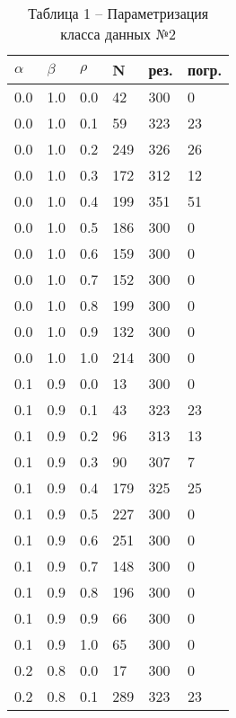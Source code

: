 \label{sec:fig2}

\renewcommand\thetable{} 

\begin{table}[!htb]
	\begin{minipage}{.45\linewidth}
		\caption*{Таблица 1 -- Параметризация класса данных №2}
		\centering
		\begin{tabular}{||p{}p{}p{}p{}p{}p{}||}
			\hline
			$\alpha$ & $\beta$ & $\rho$ & N & рез. & погр. \\ \hline\hline
			0.0 & 1.0 & 0.0 & 42 & 300 & 0 \\ 
			0.0 & 1.0 & 0.1 & 59 & 323 & 23 \\ 
			0.0 & 1.0 & 0.2 & 249 & 326 & 26 \\ 
			0.0 & 1.0 & 0.3 & 172 & 312 & 12 \\ 
			0.0 & 1.0 & 0.4 & 199 & 351 & 51 \\ 
			0.0 & 1.0 & 0.5 & 186 & 300 & 0 \\ 
			0.0 & 1.0 & 0.6 & 159 & 300 & 0 \\ 
			0.0 & 1.0 & 0.7 & 152 & 300 & 0 \\ 
			0.0 & 1.0 & 0.8 & 199 & 300 & 0 \\ 
			0.0 & 1.0 & 0.9 & 132 & 300 & 0 \\ 
			0.0 & 1.0 & 1.0 & 214 & 300 & 0  \\ \hline
			0.1 & 0.9 & 0.0 & 13 & 300 & 0 \\ 
			0.1 & 0.9 & 0.1 & 43 & 323 & 23 \\ 
			0.1 & 0.9 & 0.2 & 96 & 313 & 13 \\ 
			0.1 & 0.9 & 0.3 & 90 & 307 & 7 \\ 
			0.1 & 0.9 & 0.4 & 179 & 325 & 25 \\ 
			0.1 & 0.9 & 0.5 & 227 & 300 & 0 \\ 
			0.1 & 0.9 & 0.6 & 251 & 300 & 0 \\ 
			0.1 & 0.9 & 0.7 & 148 & 300 & 0 \\ 
			0.1 & 0.9 & 0.8 & 196 & 300 & 0 \\ 
			0.1 & 0.9 & 0.9 & 66 & 300 & 0 \\ 
			0.1 & 0.9 & 1.0 & 65 & 300 & 0  \\ \hline
			0.2 & 0.8 & 0.0 & 17 & 300 & 0 \\ 
			0.2 & 0.8 & 0.1 & 289 & 323 & 23 \\ 

\end{tabular}
\end{minipage}
\end{table}
